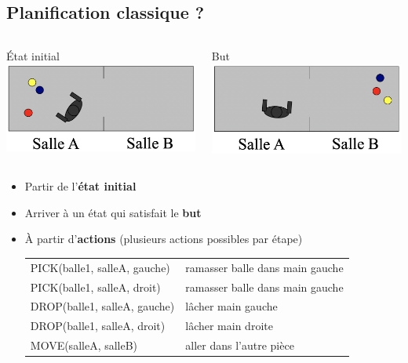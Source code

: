 \documentclass[english,french,usenames,dvipsnames]{beamer}
\begin{document}
\subsection{Planification classique ?}
\begin{frame}{\subsecname}
\begin{columns}[T,onlytextwidth]
\begin{column}{0.45\textwidth}\centering
État initial\\
\includegraphics[width=\textwidth]{figures/gripper-start.png}
\end{column}
\begin{column}{0.45\textwidth} \centering
But\\
\includegraphics[width=\textwidth]{figures/gripper-end.png}
\end{column}
\end{columns}
\begin{itemize}
    \item Partir de l'\textbf{état initial}
    \item Arriver à un état qui satisfait le \textbf{but}
    \item À partir d'\textbf{actions} {\scriptsize{}(plusieurs actions possibles par étape)} \\[10pt]
\begin{small}\begin{tabular}{l|l}
    PICK(balle1, salleA, gauche) & ramasser balle dans main gauche \\
    PICK(balle1, salleA, droit) & ramasser balle dans main gauche \\[5pt]
    DROP(balle1, salleA, gauche) & lâcher main gauche \\
    DROP(balle1, salleA, droit) & lâcher main droite \\[5pt]
    MOVE(salleA, salleB) & aller dans l'autre pièce
\end{tabular}\end{small}
\end{itemize}
\end{frame}
\end{document}
